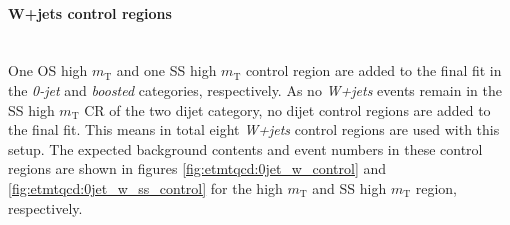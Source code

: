 \paragraph{W+jets control regions}\mbox{} \\ 
One OS high $m_\text{T}$ and one SS high $m_\text{T}$ control region are added to the final fit in the \textit{0-jet} and \textit{boosted} categories, respectively. As no \textit{W+jets} events remain in the SS high $m_\text{T}$ CR of the two dijet category, no dijet control regions are added to the final fit. 
This means in total eight \textit{W+jets} control regions are used with this setup.
The expected background contents and event numbers in these control regions are shown in figures \ref{fig:etmtqcd:0jet_w_control} and \ref{fig:etmtqcd:0jet_w_ss_control} for the high $m_\text{T}$ and SS high $m_\text{T}$ region, respectively.

